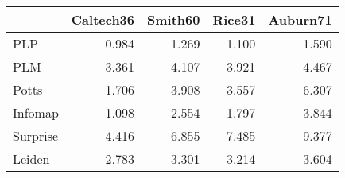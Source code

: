 \begin{tabular}{lrrrr}
\toprule
{} & Caltech36 & Smith60 & Rice31 & Auburn71 \\
\midrule
PLP      &     0.984 &   1.269 &  1.100 &    1.590 \\
PLM      &     3.361 &   4.107 &  3.921 &    4.467 \\
Potts    &     1.706 &   3.908 &  3.557 &    6.307 \\
Infomap  &     1.098 &   2.554 &  1.797 &    3.844 \\
Surprise &     4.416 &   6.855 &  7.485 &    9.377 \\
Leiden   &     2.783 &   3.301 &  3.214 &    3.604 \\
\bottomrule
\end{tabular}

